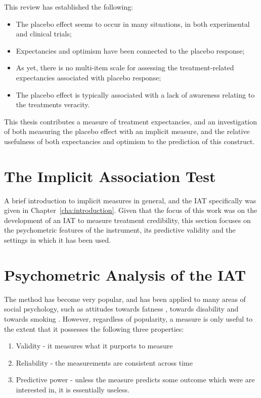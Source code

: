 This review has established the following:

\begin{itemize}
\item The placebo effect seems to occur in many situations, in both experimental and clinical trials;
\item Expectancies and optimism have been connected to the placebo response;
\item As yet, there is no multi-item scale for assessing the treatment-related expectancies associated with placebo response;
\item The placebo effect is typically associated with a lack of awareness relating to the treatments veracity.
\end{itemize}

This thesis contributes a measure of treatment expectancies, and an investigation of both measuring the placebo effect with an implicit measure, and the relative usefulness of both expectancies and optimism to the prediction of this construct. 

\section{The Implicit Association Test}
\label{sec:impl-assoc-test}

A brief introduction to implicit measures in general, and the IAT specifically was given in Chapter~\ref{cha:introduction}. Given that the focus of this work was on the development of an IAT to measure treatment credibility, this section focuses on the psychometric features of the instrument, its predictive validity and the settings in which it has been used. 


\section{Psychometric Analysis of the IAT}
\label{sec:uses-psych-feat}

The method has become very popular, and has been applied to many areas of social psychology, such as attitudes towards fatness \cite{Ahern2008}, towards disability \cite{Pruett2006} and towards smoking \cite{Kahler2007}. However, regardless of popularity, a measure is only useful to the extent that it possesses the following three properties:


\begin{enumerate}
\item Validity - it measures what it purports to measure
\item Reliability - the measurements are consistent across time
\item Predictive power - unless the measure predicts some outcome which were are interested in, it is essentially useless.
\end{enumerate}

